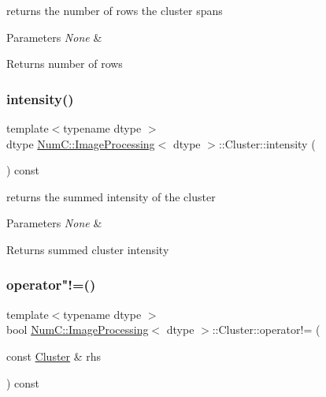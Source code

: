returns the number of rows the cluster spans


\begin{DoxyParams}{Parameters}
{\em None} & \\
\hline
\end{DoxyParams}
\begin{DoxyReturn}{Returns}
number of rows 
\end{DoxyReturn}
\mbox{\label{class_num_c_1_1_image_processing_1_1_cluster_ad68801ae625be617a59bff60131b34e6}} 
\subsubsection{\texorpdfstring{intensity()}{intensity()}}
{\footnotesize\ttfamily template$<$typename dtype $>$ \\
dtype \mbox{\hyperlink{class_num_c_1_1_image_processing}{Num\+C\+::\+Image\+Processing}}$<$ dtype $>$\+::Cluster\+::intensity (\begin{DoxyParamCaption}{ }\end{DoxyParamCaption}) const\hspace{0.3cm}{\ttfamily [inline]}}

returns the summed intensity of the cluster


\begin{DoxyParams}{Parameters}
{\em None} & \\
\hline
\end{DoxyParams}
\begin{DoxyReturn}{Returns}
summed cluster intensity 
\end{DoxyReturn}
\mbox{\label{class_num_c_1_1_image_processing_1_1_cluster_ae27f961f8a5b5163c8dcf5858a3b2848}} 
\subsubsection{\texorpdfstring{operator"!=()}{operator!=()}}
{\footnotesize\ttfamily template$<$typename dtype $>$ \\
bool \mbox{\hyperlink{class_num_c_1_1_image_processing}{Num\+C\+::\+Image\+Processing}}$<$ dtype $>$\+::Cluster\+::operator!= (\begin{DoxyParamCaption}\item[{const \mbox{\hyperlink{class_num_c_1_1_image_processing_1_1_cluster}{Cluster}} \&}]{rhs }\end{DoxyParamCaption}) const\hspace{0.3cm}{\ttfamily [inline]}}

